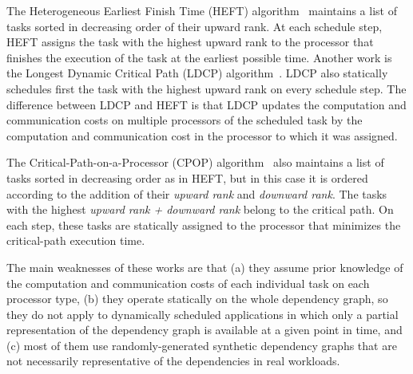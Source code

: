 The Heterogeneous Earliest Finish Time (HEFT) algorithm~\cite{HEFT} maintains a list of tasks sorted in decreasing order of their upward rank. At each schedule step, HEFT assigns the task with the highest upward rank to the processor that finishes the execution of the task at the earliest possible time. Another work is the Longest Dynamic Critical Path (LDCP) algorithm~\cite{LDCP}. LDCP also statically schedules first the task with the highest upward rank on every schedule step. The difference between LDCP and HEFT is that LDCP updates the computation and communication costs on multiple processors of the scheduled task by the computation and communication cost in the processor to which it was assigned.

The Critical-Path-on-a-Processor (CPOP) algorithm~\cite{HEFT} also maintains a list of tasks sorted in decreasing order as in HEFT, but in this case it is ordered according to the addition of their \textit{upward rank} and \textit{downward rank}. The tasks with the highest \textit{upward rank + downward rank} belong to the critical path. On each step, these tasks are statically assigned to the processor that minimizes the critical-path execution time.


The main weaknesses of these works are that (a) they assume prior knowledge of the computation and communication costs of each individual task on each processor type, (b) they operate statically on the whole dependency graph, so they do not apply to dynamically scheduled applications in which only a partial representation of the dependency graph is available at a given point in time, and (c) most of them use randomly-generated synthetic dependency graphs that are not necessarily representative of the dependencies in real workloads.




